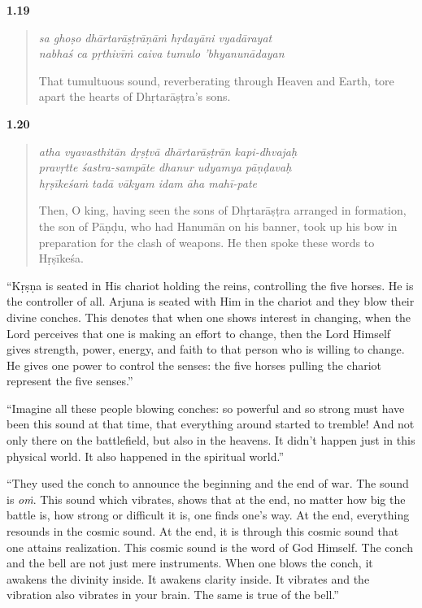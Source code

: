 \par\noindent\textbf{1.19}\par
\begin{verse}
\textit{sa ghoṣo dhārtarāṣṭrāṇāṁ hṛdayāni vyadārayat} \\
\textit{nabhaś ca pṛthivīṁ caiva tumulo ’bhyanunādayan}

\noindent That tumultuous sound, reverberating through Heaven and Earth, tore apart the hearts of Dhṛtarāṣṭra’s sons.
\end{verse}
\par



\par\noindent\textbf{1.20}\par
\begin{verse}
\textit{atha vyavasthitān dṛṣṭvā dhārtarāṣṭrān kapi-dhvajaḥ} \\
\textit{pravṛtte śastra-sampāte dhanur udyamya pāṇḍavaḥ} \\
\textit{hṛṣīkeśaṁ tadā vākyam idam āha mahī-pate}

\noindent Then, O king, having seen the sons of Dhṛtarāṣṭra arranged in formation, the son of Pāṇḍu, who had Hanumān on his banner, took up his bow in preparation for the clash of weapons. He then spoke these words to Hṛṣīkeśa.
\end{verse}
\par



\enquote{Kṛṣṇa is seated in His chariot holding the reins, controlling the five horses. He is the controller of all. Arjuna is seated with Him in the chariot and they blow their divine conches. This denotes that when one shows interest in changing, when the Lord perceives that one is making an effort to change, then the Lord Himself gives strength, power, energy, and faith to that person who is willing to change. He gives one power to control the senses: the five horses pulling the chariot represent the five senses.}

\enquote{Imagine all these people blowing conches: so powerful and so strong must have been this sound at that time, that everything around started to tremble! And not only there on the battlefield, but also in the heavens. It didn’t happen just in this physical world. It also happened in the spiritual world.}


\enquote{They used the conch to announce the beginning and the end of war. The sound is \textit{oṁ}. This sound which vibrates, shows that at the end, no matter how big the battle is, how strong or difficult it is, one finds one’s way. At the end, everything resounds in the cosmic sound. At the end, it is through this cosmic sound that one attains realization. This cosmic sound is the word of God Himself. The conch and the bell are not just mere instruments. When one blows the conch, it awakens the divinity inside. It awakens clarity inside. It vibrates and the vibration also vibrates in your brain. The same is true of the bell.}

